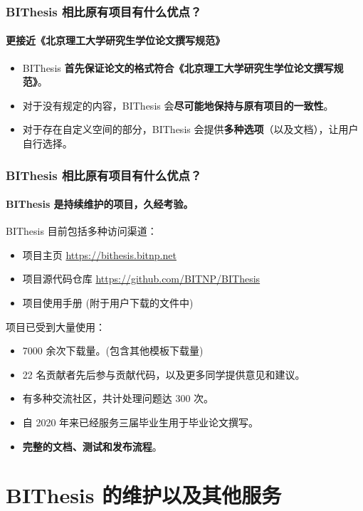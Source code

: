 \documentclass[
  aspectratio=169,
  presentation,
  titlegraphic=./images/bit.png,
  framelogo=./images/bit.png
]{bitbeamer}
\begin{document}
\begin{frame}[t]
\begin{figure}
\begin{subfigure}{0.45\textwidth}
    \end{subfigure}
  \end{figure}
\end{frame}


\begin{frame}[t]
  \frametitle{BIThesis 相比原有项目有什么优点？}
  \framesubtitle{更接近《北京理工大学研究生学位论文撰写规范》}

  \begin{itemize}
    \item BIThesis \textbf{首先保证论文的格式符合《北京理工大学研究生学位论文撰写规范》}。
    \item 对于没有规定的内容，BIThesis 会\textbf{尽可能地保持与原有项目的一致性}。
    \item 对于存在自定义空间的部分，BIThesis 会提供\textbf{多种选项}（以及文档），让用户自行选择。
  \end{itemize}
  

\end{frame}

\begin{frame}[t]
  \frametitle{BIThesis 相比原有项目有什么优点？}
  \framesubtitle{BIThesis 是持续维护的项目，久经考验。}

  BIThesis 目前包括多种访问渠道：
  \begin{itemize}
    \item 项目主页 \url{https://bithesis.bitnp.net}
    \item 项目源代码仓库 \url{https://github.com/BITNP/BIThesis}
    \item 项目使用手册 (附于用户下载的文件中)
  \end{itemize}

  \vspace{0.5cm}
  
  项目已受到大量使用：
  \begin{itemize}
    \item 7000 余次下载量。(包含其他模板下载量)
    \item 22 名贡献者先后参与贡献代码，以及更多同学提供意见和建议。
    \item 有多种交流社区，共计处理问题达 300 次。
    \item 自 2020 年来已经服务三届毕业生用于毕业论文撰写。
    \item \textbf{完整的文档、测试和发布流程}。
  \end{itemize}
\end{frame}

\section{BIThesis 的维护以及其他服务}
\end{document}
